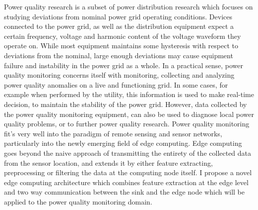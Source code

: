 Power quality research is a subset of power distribution research which focuses on studying  deviations from nominal power grid operating conditions. Devices connected to the power grid, as well as the distribution equipment expect a certain frequency, voltage and harmonic content of the voltage waveform they operate on. While most equipment maintains some hysteresis with respect to deviations from the nominal, large enough deviations may cause equipment failure and instability in the power grid as a whole. In a practical sense, power quality monitoring concerns itself with monitoring, collecting and analyzing power quality anomalies on a live and functioning grid. In some cases, for example when performed by the utility, this information is used to make real-time decision, to maintain the stability of the power grid. However, data collected by the power quality monitoring equipment, can also be used to diagnose local power quality problems, or to further power quality research. Power quality monitoring fit's very well into the paradigm of remote sensing and sensor networks, particularly into the newly emerging field of edge computing. Edge computing goes beyond the naive approach of transmitting the entirety of the collected data from the sensor location, and extends it by either feature extracting, preprocessing or filtering the data at the computing node itself. I propose a novel edge computing architecture which combines feature extraction at the edge level and two way communication between the sink and the edge node which will be applied to the power quality monitoring domain.

